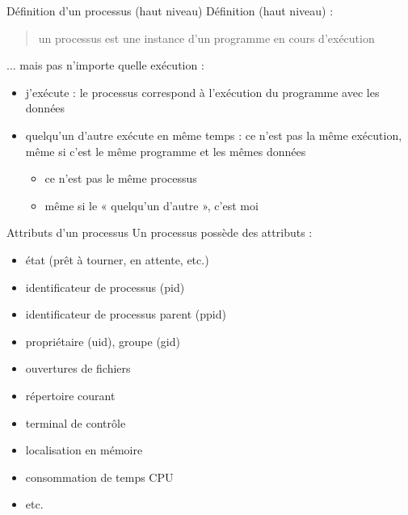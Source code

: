 \def\inc{inc4-ps}




\begin {frame} {Définition d'un processus (haut niveau)}
    Définition (haut niveau) :

    \begin {quote}
	un processus est une instance d'un programme en cours d'exécution
    \end {quote}

    ... mais pas n'importe quelle exécution :

    \begin {itemize}
	\item j'exécute  : le processus correspond à
	    l'exécution du programme  avec les données

	\item quelqu'un d'autre exécute  en même
	    temps : ce n'est pas la même exécution, même si c'est le
	    même programme et les mêmes données

	    \begin {itemize}
		\item ce n'est pas le même processus
		\item même si le « quelqu'un d'autre », c'est moi
	    \end {itemize}

    \end {itemize}
\end {frame}

\begin {frame} {Attributs d'un processus}
    Un processus possède des attributs :

    \begin {itemize}
	\fB
	\item état (prêt à tourner, en attente, etc.)
	\item identificateur de processus (pid)
	\item identificateur de processus parent (ppid)
	\item propriétaire (uid), groupe (gid)
	\item ouvertures de fichiers
	\item répertoire courant
	\item terminal de contrôle
	\item localisation en mémoire
	\item consommation de temps CPU
	\item etc.
    \end {itemize}

\end {frame}

